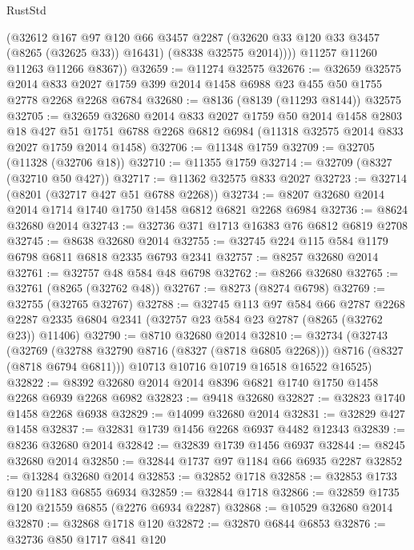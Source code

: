 \begin{lexlean}{RustStd}
\begin{coremodule}
            (@32612
              @167
              @97
              @120
              @66
              @3457
              @2287
              (@32620 @33 @120 @33 @3457 (@8265 (@32625 @33)) @16431)
              (@8338 @32575 @2014))))
        @11257
        @11260
        @11263
        @11266
        @8367))
@32659 := @11274 @32575
@32676 := @32659
    @32575
    @2014
    @833
    @2027
    @1759
    @399
    @2014
    @1458
    @6988
    @23
    @455
    @50
    @1755
    @2778
    @2268
    @2268
    @6784
@32680 := @8136 (@8139 (@11293 @8144)) @32575
@32705 := @32659
    @32680
    @2014
    @833
    @2027
    @1759
    @50
    @2014
    @1458
    @2803
    @18
    @427
    @51
    @1751
    @6788
    @2268
    @6812
    @6984
    (@11318 @32575 @2014 @833 @2027 @1759 @2014 @1458)
@32706 := @11348 @1759
@32709 := @32705 (@11328 (@32706 @18))
@32710 := @11355 @1759
@32714 := @32709 (@8327 (@32710 @50 @427))
@32717 := @11362 @32575 @833 @2027
@32723 := @32714 (@8201 (@32717 @427 @51 @6788 @2268))
@32734 := @8207 @32680 @2014 @2014 @1714 @1740 @1750 @1458 @6812 @6821 @2268 @6984
@32736 := @8624 @32680 @2014
@32743 := @32736 @371 @1713 @16383 @76 @6812 @6819 @2708
@32745 := @8638 @32680 @2014
@32755 := @32745 @224 @115 @584 @1179 @6798 @6811 @6818 @2335 @6793 @2341
@32757 := @8257 @32680 @2014
@32761 := @32757 @48 @584 @48 @6798
@32762 := @8266 @32680
@32765 := @32761 (@8265 (@32762 @48))
@32767 := @8273 (@8274 @6798)
@32769 := @32755 (@32765 @32767)
@32788 := @32745
    @113
    @97
    @584
    @66
    @2787
    @2268
    @2287
    @2335
    @6804
    @2341
    (@32757 @23 @584 @23 @2787 (@8265 (@32762 @23)) @11406)
@32790 := @8710 @32680 @2014
@32810 := @32734
    (@32743
      (@32769 (@32788 @32790 @8716 (@8327 (@8718 @6805 @2268))) @8716 (@8327 (@8718 @6794 @6811)))
      @10713
      @10716
      @10719
      @16518
      @16522
      @16525)
@32822 := @8392 @32680 @2014 @2014 @8396 @6821 @1740 @1750 @1458 @2268 @6939 @2268 @6982
@32823 := @9418 @32680
@32827 := @32823 @1740 @1458 @2268 @6938
@32829 := @14099 @32680 @2014
@32831 := @32829 @427 @1458
@32837 := @32831 @1739 @1456 @2268 @6937 @4482 @12343
@32839 := @8236 @32680 @2014
@32842 := @32839 @1739 @1456 @6937
@32844 := @8245 @32680 @2014
@32850 := @32844 @1737 @97 @1184 @66 @6935 @2287
@32852 := @13284 @32680 @2014
@32853 := @32852 @1718
@32858 := @32853 @1733 @120 @1183 @6855 @6934
@32859 := @32844 @1718
@32866 := @32859 @1735 @120 @21559 @6855 (@2276 @6934 @2287)
@32868 := @10529 @32680 @2014
@32870 := @32868 @1718 @120
@32872 := @32870 @6844 @6853
@32876 := @32736 @850 @1717 @841 @120

\end{coremodule}
\end{lexlean}
